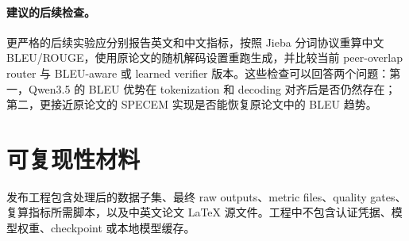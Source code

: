 \documentclass[11pt]{ctexart}
\begin{document}
\paragraph{建议的后续检查。}
更严格的后续实验应分别报告英文和中文指标，按照 Jieba 分词协议重算中文 BLEU/ROUGE，使用原论文的随机解码设置重跑生成，并比较当前 peer-overlap router 与 BLEU-aware 或 learned verifier 版本。这些检查可以回答两个问题：第一，Qwen3.5 的 BLEU 优势在 tokenization 和 decoding 对齐后是否仍然存在；第二，更接近原论文的 SPECEM 实现是否能恢复原论文中的 BLEU 趋势。

\section{可复现性材料}
发布工程包含处理后的数据子集、最终 raw outputs、metric files、quality gates、复算指标所需脚本，以及中英文论文 \LaTeX{} 源文件。工程中不包含认证凭据、模型权重、checkpoint 或本地模型缓存。
\end{document}
